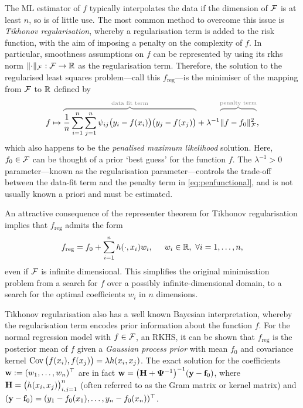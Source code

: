 \documentclass[11pt,twoside,openright,showframe]{report}
\begin{document}
The ML estimator of $f$ typically interpolates the data if the dimension of ${\mathcal F}$ is at least $n$, so is of little use.
The most common method to overcome this issue is \emph{Tikhonov regularisation}, whereby a regularisation term is added to the risk function, with the aim of imposing a penalty on the complexity of $f$. 
In particular, smoothness assumptions on $f$ can be represented by using its \gls{rkhs} norm $\lVert\cdot\rVert_{\mathcal F}:{\mathcal F} \to \mathbb{R}$ as the regularisation term\footnotemark. 
Therefore, the solution to the regularised least squares problem---call this $f_{\text{reg}}$---is the minimiser of the mapping from ${\mathcal F}$ to $\mathbb{R}$ defined by
%
\begin{equation}\label{eq:penfunctional}
  f \mapsto 
  \myoverbrace{\frac{1}{n}\sum_{i=1}^n \sum_{j=1}^n \psi_{ij} \big( y_i - f(x_i) \big) \big( y_j - f(x_j) \big)}{\text{data fit term}}
  + \lambda^{-1} 
  \myoverbrace{\vphantom{\sum_{i=1}^n} \norm{f-f_0}^2_\cF}{\text{penalty term}}
  ,
\end{equation}
%
which also happens to be the \emph{penalised maximum likelihood} solution. 
Here, $f_0 \in {\mathcal F}$ can be thought of a prior `best guess' for the function $f$.
The $\lambda^{-1} > 0$ parameter---known as the regularisation parameter---controls the trade-off between the data-fit term and the penalty term in \cref{eq:penfunctional}, and is not usually known a priori and must be estimated.

An attractive consequence of the representer theorem \citep{kimeldorf1970correspondence} for Tikhonov regularisation implies that $f_\text{reg}$ admits the form
%
\begin{align}\label{eq:repform}
  f_\text{reg} = f_0 + \sum_{i=1}^n h(\cdot,x_i)w_i, \hspace{0.5cm} w_i \in \mathbb{R}, \ \forall i=1,\dots,n, 
\end{align}
%
even if ${\mathcal F}$ is infinite dimensional.
This simplifies the original minimisation problem from a search for $f$ over a possibly infinite-dimensional domain, to a search for the optimal coefficients $w_i$ in $n$ dimensions.


Tikhonov regularisation also has a well known Bayesian interpretation, whereby the regularisation term encodes prior information about the function $f$. 
For the normal regression model with $f \in {\mathcal F}$, an RKHS, it can be shown that $f_{\text{reg}}$ is the posterior mean of $f$ given a \emph{Gaussian process prior} \citep{rasmussen2006gaussian} with mean $f_0$ and covariance kernel $\operatorname{Cov}\big(f(x_i),f(x_j)\big) = \lambda h(x_i, x_j)$. 
The exact solution for the coefficients ${\mathbf w} := (w_1,\dots,w_n)^\top$ are in fact ${\mathbf w} = \big({\mathbf H} + {\bm\Psi}^{-1}\big)^{-1}({\mathbf y} - {\mathbf f}_0)$, where ${\mathbf H} = \big(h(x_i,x_j) \big)_{i,j=1}^n$ (often referred to as the Gram matrix or kernel matrix) and $({\mathbf y} - {\mathbf f}_0) = (y_1 - f_0(x_1), \dots, y_n - f_0(x_n))^\top$.
\end{document}
